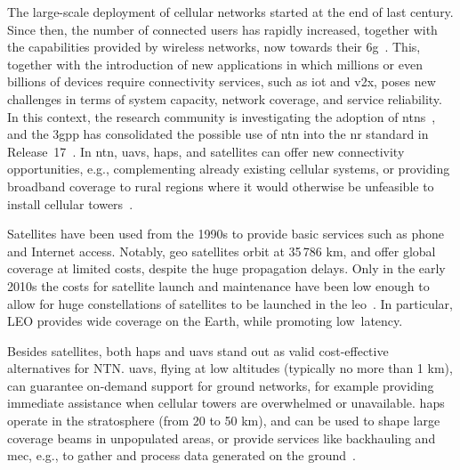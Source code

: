 The large-scale deployment of cellular networks started at the end of last century.
Since then, the number of connected users has rapidly increased, together with the capabilities provided by wireless networks, now towards their \gls{6g}~\cite{giordani2020toward}.
This, together with the introduction of new applications in which millions or even billions of devices require connectivity services, such as \gls{iot} and \gls{v2x}, poses new challenges in terms of system capacity, network coverage, and service reliability. 
In this context, the research community is investigating the adoption of \glspl{ntn}~\cite{giordani2021non}, and the \gls{3gpp} has consolidated the possible use of \gls{ntn} into the \gls{nr} standard in Release~17~\cite{21917}.
In \gls{ntn}, \glspl{uav}, \glspl{hap}, and satellites can offer new connectivity opportunities, e.g., complementing already existing cellular systems, or providing broadband coverage to rural regions where it would otherwise be unfeasible to install cellular towers~\cite{Chaoub20216g}.

Satellites have been used from the 1990s to provide basic services such as phone and Internet access. Notably,  \gls{geo} satellites orbit at 35\,786 km, and offer global coverage at limited costs, despite the huge propagation delays. 
Only in the early 2010s the costs for satellite launch and maintenance have been low enough to allow for huge constellations of satellites to be launched in the \gls{leo}~\cite{satcost}. In particular, LEO provides wide coverage on the Earth, while promoting low~latency. 

Besides satellites, both \glspl{hap} and \glspl{uav} stand out as valid cost-effective alternatives for NTN. 
\glspl{uav}, flying at low altitudes (typically no more than 1 km), can guarantee on-demand support for ground networks, for example providing immediate assistance when cellular towers are overwhelmed or unavailable. \glspl{hap} operate in the stratosphere (from 20 to 50 km), and can be used to shape large coverage beams in  unpopulated areas, or provide services like backhauling and \gls{mec}, e.g., to gather and process data generated on the ground~\cite{traspadini2023real,wang2020potential}. %

